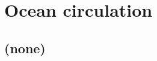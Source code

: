 
\cleardoublepage


\chapter{Ocean circulation}\label{ch:ocean-circulation}

\hfill \break

\newpage

\section{(none)}

